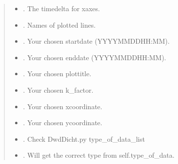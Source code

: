 \documentclass[letterpaper,10pt,english]{sphinxmanual}
\begin{document}
\begin{fulllineitems}
\begin{fulllineitems}
\begin{quote}
\begin{description}
\begin{itemize}
\item {} 
\sphinxAtStartPar
{} \textendash{} . The timedelta for x\sphinxhyphen{}axes.

\item {} 
\sphinxAtStartPar
{} \textendash{} . Names of plotted lines.

\item {} 
\sphinxAtStartPar
{} \textendash{} . Your chosen start\sphinxhyphen{}date (YYYY\sphinxhyphen{}MM\sphinxhyphen{}DD\sphinxhyphen{}HH:MM).

\item {} 
\sphinxAtStartPar
{} \textendash{} . Your chosen end\sphinxhyphen{}date (YYYY\sphinxhyphen{}MM\sphinxhyphen{}DD\sphinxhyphen{}HH:MM).

\item {} 
\sphinxAtStartPar
{} \textendash{} .  Your chosen plot\sphinxhyphen{}title.

\item {} 
\sphinxAtStartPar
{} \textendash{} . Your chosen k\_factor.

\item {} 
\sphinxAtStartPar
{} \textendash{} . Your chosen x\sphinxhyphen{}coordinate.

\item {} 
\sphinxAtStartPar
{} \textendash{} . Your chosen y\sphinxhyphen{}coordinate.

\item {} 
\sphinxAtStartPar
{} \textendash{} . Check DwdDicht.py type\_of\_data\_list

\item {} 
\sphinxAtStartPar
{} \textendash{} . Will get the correct type from self.type\_of\_data.


\end{itemize}
\end{description}
\end{quote}
\end{fulllineitems}
\end{fulllineitems}
\end{document}
